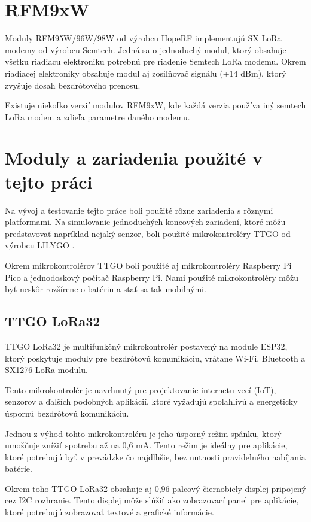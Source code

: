\documentclass[slovak,master]{diploma}
\begin{document}
\section{RFM9xW}
Moduly RFM95W/96W/98W od výrobcu HopeRF \cite{hoperf} implementujú SX LoRa modemy od výrobcu Semtech.
Jedná sa o jednoduchý modul, ktorý obsahuje všetku riadiacu elektroniku potrebnú pre riadenie Semtech LoRa modemu.
Okrem riadiacej elektroniky obsahuje modul aj zosilňovač signálu (+14 dBm), ktorý zvyšuje dosah bezdrôtového prenosu.

Existuje niekoľko verzií modulov RFM9xW, kde každá verzia používa iný semtech LoRa modem a zdieľa parametre daného modemu.

\section{Moduly a zariadenia použité v tejto práci}
Na vývoj a testovanie tejto práce boli použité rôzne zariadenia s rôznymi platformami. Na simulovanie jednoduchých koncových zariadení, 
ktoré môžu predstavovať napríklad nejaký senzor, boli použité mikrokontroléry TTGO od výrobcu LILYGO \cite{lilygo}.

Okrem mikrokontrolérov TTGO boli použité aj mikrokontroléry Raspberry Pi Pico a jednodoskový počítač Raspberry Pi.
Nami použité mikrokontroléry môžu byť neskôr rozšírene o batériu a stať sa tak mobilnými.

\subsection{TTGO LoRa32}
TTGO LoRa32 je multifunkčný mikrokontrolér postavený na module ESP32, ktorý poskytuje 
moduly pre bezdrôtovú komunikáciu, vrátane Wi-Fi, Bluetooth a SX1276 LoRa modulu. 

Tento mikrokontrolér je navrhnutý pre projektovanie internetu vecí (IoT), senzorov a ďalších podobných aplikácií, 
ktoré vyžadujú spoľahlivú a energeticky úspornú bezdrôtovú komunikáciu.

Jednou z výhod tohto mikrokontroléru je jeho úsporný režim spánku, ktorý umožňuje znížiť spotrebu až na 0,6 mA. 
Tento režim je ideálny pre aplikácie, ktoré potrebujú byť v prevádzke čo najdlhšie, bez nutnosti pravidelného nabíjania batérie.

Okrem toho TTGO LoRa32 obsahuje aj 0,96 palcový čiernobiely displej pripojený cez I2C rozhranie. 
Tento displej môže slúžiť ako zobrazovací panel pre aplikácie, ktoré potrebujú zobrazovať textové a grafické informácie.
\end{document}
